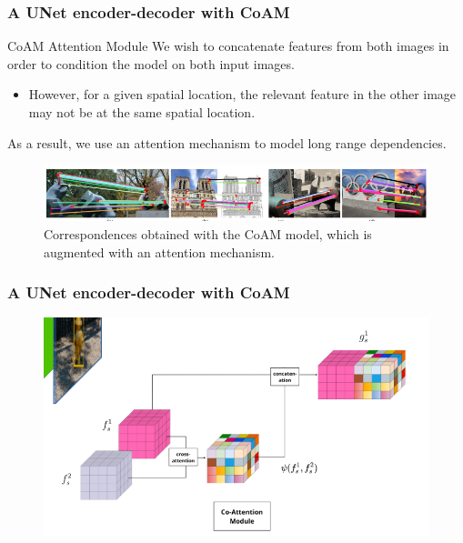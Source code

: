 \documentclass[13.5pt,aspecratio=169, xcolor=dvipsnames]{beamer}
\begin{document}
\begin{frame}
    \onehalfspacing
        \frametitle{A UNet encoder-decoder with CoAM}
        
        \begin{block}{CoAM Attention Module}
            We wish to concatenate features from both images in order to condition the model on both input images.
            \begin{itemize}
                \item However, for a given spatial location, the
                relevant feature in the other image may not be at the same spatial location.
            \end{itemize}
            As a result, we use an
            attention mechanism to model long range dependencies.
        \end{block}
        \begin{figure}[h]
            \centering
            \includegraphics[width=\linewidth]{CoAM_model.png}
            \caption{Correspondences obtained with the CoAM model, which is augmented with an attention mechanism. }
        \end{figure}
\end{frame}

\begin{frame}
\onehalfspacing
	\frametitle{A UNet encoder-decoder with CoAM}
    \begin{figure}[h]
        \centering
        \includegraphics[width=\linewidth]{Co_Attention_Module.png}
    \end{figure}
\end{frame}
\end{document}
